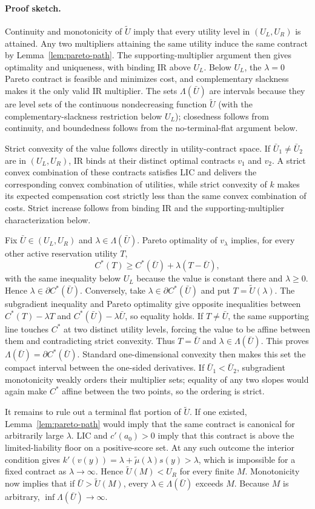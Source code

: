 \documentclass[11pt]{article}
\theoremstyle{remark}
\newcommand{\proofsketch}{\paragraph{Proof sketch.}}
\begin{document}
\proofsketch
Continuity and monotonicity of $\widetilde U$ imply that every utility level in
$(U_L,U_R)$ is attained.  Any two multipliers attaining the same utility induce
the same contract by Lemma~\ref{lem:pareto-path}.  The supporting-multiplier
argument then gives optimality and uniqueness, with binding IR above $U_L$.
Below $U_L$, the $\lambda=0$ Pareto contract is feasible and minimizes cost, and
complementary slackness makes it the only valid IR multiplier.  The sets
$\Lambda(\bar U)$ are intervals because they are level sets of the continuous
nondecreasing function $\widetilde U$ (with the complementary-slackness
restriction below $U_L$); closedness follows from continuity, and boundedness
follows from the no-terminal-flat argument below.

Strict convexity of the value follows directly in utility-contract space.  If
$\bar U_1\ne\bar U_2$ are in $(U_L,U_R)$, IR binds at their distinct optimal
contracts $v_1$ and $v_2$.  A strict convex combination of these contracts
satisfies LIC and delivers the corresponding convex combination of utilities,
while strict convexity of $k$ makes its expected compensation cost strictly less
than the same convex combination of costs.  Strict increase follows from binding
IR and the supporting-multiplier characterization below.

Fix $\bar U\in(U_L,U_R)$ and $\lambda\in\Lambda(\bar U)$.  Pareto optimality of
$v_\lambda$ implies, for every other active reservation utility $T$,
\[
 C^*(T)\ge C^*(\bar U)+\lambda(T-\bar U),
\]
with the same inequality below $U_L$ because the value is constant there and
$\lambda\ge0$.  Hence $\lambda\in\partial C^*(\bar U)$.  Conversely, take
$\lambda\in\partial C^*(\bar U)$ and put $T=\widetilde U(\lambda)$.  The
subgradient inequality and Pareto optimality give opposite inequalities between
$C^*(T)-\lambda T$ and $C^*(\bar U)-\lambda\bar U$, so equality holds.  If
$T\ne\bar U$, the same supporting line touches $C^*$ at two distinct utility
levels, forcing the value to be affine between them and contradicting strict
convexity.  Thus $T=\bar U$ and $\lambda\in\Lambda(\bar U)$.  This proves
$\Lambda(\bar U)=\partial C^*(\bar U)$.  Standard one-dimensional convexity then
makes this set the compact interval between the one-sided derivatives.  If
$\bar U_1<\bar U_2$, subgradient monotonicity weakly orders their multiplier
sets; equality of any two slopes would again make $C^*$ affine between the two
points, so the ordering is strict.

It remains to rule out a terminal flat portion of $\widetilde U$.  If one
existed, Lemma~\ref{lem:pareto-path} would imply that the same contract is
canonical for arbitrarily large $\lambda$.  LIC and $c'(a_0)>0$ imply that this
contract is above the limited-liability floor on a positive-score set.  At any
such outcome the interior condition gives
$k'(v(y))=\lambda+\widetilde\mu(\lambda)s(y)>\lambda$, which is impossible for a
fixed contract as $\lambda\to\infty$.  Hence
$\widetilde U(M)<U_R$ for every finite $M$.  Monotonicity now implies that if
$\bar U>\widetilde U(M)$, every $\lambda\in\Lambda(\bar U)$ exceeds $M$.
Because $M$ is arbitrary, $\inf\Lambda(\bar U)\to\infty$.
\end{document}
